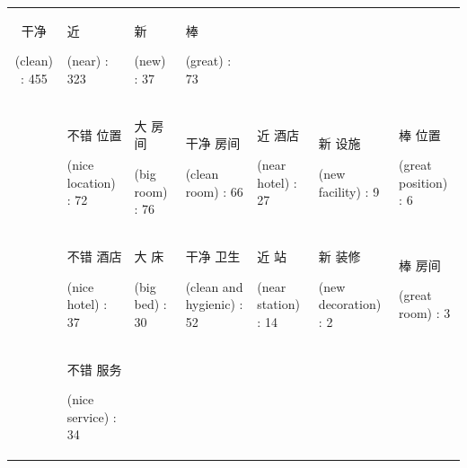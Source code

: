 \documentclass[smallextended,natbib]{svjour3}       %
\begin{document}
\begin{landscape}
\begin{table}[p]
{\begin{tabular}{|c|l|l|l|l|l|l|}
          \begin{CJK}{UTF8}{gbsn}干净\end{CJK} (clean) : 455 &
          \begin{CJK}{UTF8}{gbsn}近\end{CJK} (near) : 323 &
          \begin{CJK}{UTF8}{gbsn}新\end{CJK} (new) : 37 &
          \begin{CJK}{UTF8}{gbsn}棒\end{CJK} (great) : 73 \\
         &
          \begin{CJK}{UTF8}{gbsn}不错 位置\end{CJK} (nice location) : 72 &
          \begin{CJK}{UTF8}{gbsn}大 房间\end{CJK} (big room) : 76 &
          \begin{CJK}{UTF8}{gbsn}干净 房间\end{CJK} (clean room) : 66 &
          \begin{CJK}{UTF8}{gbsn}近 酒店\end{CJK} (near hotel) : 27 &
          \begin{CJK}{UTF8}{gbsn}新 设施\end{CJK} (new facility) : 9 &
          \begin{CJK}{UTF8}{gbsn}棒 位置\end{CJK} (great position) : 6 \\
         &
          \begin{CJK}{UTF8}{gbsn}不错 酒店\end{CJK} (nice hotel) : 37 &
          \begin{CJK}{UTF8}{gbsn}大 床\end{CJK} (big bed) : 30 &
          \begin{CJK}{UTF8}{gbsn}干净 卫生\end{CJK} (clean and hygienic) : 52 &
          \begin{CJK}{UTF8}{gbsn}近 站\end{CJK} (near station) : 14 &
          \begin{CJK}{UTF8}{gbsn}新 装修\end{CJK} (new decoration) : 2 &
          \begin{CJK}{UTF8}{gbsn}棒 房间\end{CJK} (great room) : 3 \\
         &
          \begin{CJK}{UTF8}{gbsn}不错 服务\end{CJK} (nice service) : 34 &

\end{tabular}}
\end{table}
\end{landscape}
\end{document}

